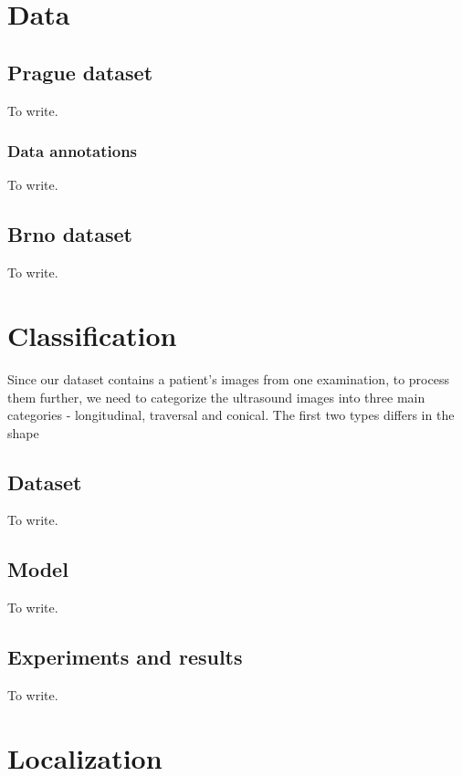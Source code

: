 


\chapter{Data}
\section{Prague dataset}
To write.

\subsection{Data annotations}
To write.


\section{Brno dataset}
To write.



\chapter{Classification}
Since our dataset contains a patient's images from one examination, to process
them further, we need to categorize the ultrasound images into three main 
categories - longitudinal, traversal and conical. The first two types differs 
in the shape  

\section{Dataset}
To write.

\section{Model}
To write.

\section{Experiments and results}
To write.



\chapter{Localization}

